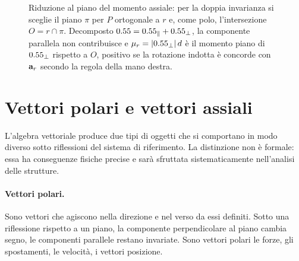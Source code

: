 \begin{figure}[htbp]
	\caption[Momento assiale come momento piano]{Riduzione al piano del
		momento assiale: per la doppia invarianza si sceglie il piano
		$\pi$ per $P$ ortogonale a $r$ e, come polo, l'intersezione
		$O = r \cap \pi$. Decomposto $0.55 = 0.55_\parallel + 0.55_\perp$,
		la componente parallela non contribuisce e $\mu_r = |0.55_\perp|\,d$
		è il momento piano di $0.55_\perp$ rispetto a $O$, positivo se la
		rotazione indotta è concorde con $\mathbf{a}_r$ secondo la regola della
		mano destra.}
	\label{f:momento_assiale_piano}
\end{figure}



\section{Vettori polari e vettori assiali}\label{sec:polari_assiali}

L'algebra vettoriale produce due tipi di oggetti che si comportano in
modo diverso sotto riflessioni del sistema di riferimento. La
distinzione non è formale: essa ha conseguenze fisiche precise e sarà
sfruttata sistematicamente nell'analisi delle strutture.

\paragraph{Vettori polari.}
Sono vettori che agiscono nella direzione e nel verso da essi definiti.
Sotto una riflessione rispetto a un piano, la componente perpendicolare
al piano cambia segno, le componenti parallele restano invariate.
Sono vettori polari le forze, gli spostamenti, le velocità, i vettori
posizione.


